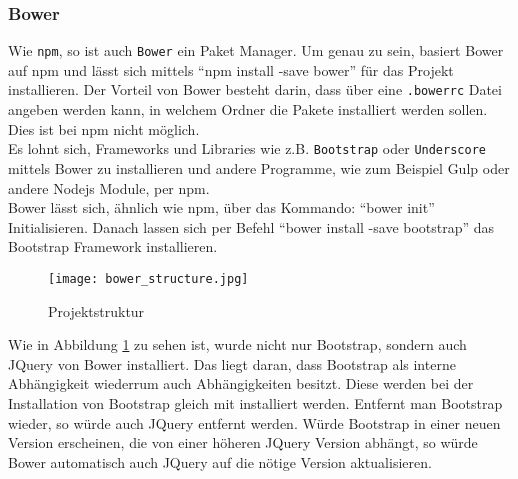 
		\subsubsection{Bower} %
		\label{ssub:bower}
			Wie \texttt{npm}, so ist auch \texttt{Bower} ein Paket Manager. Um genau zu sein, basiert Bower auf npm und lässt sich mittels "`npm install -save bower"' für das Projekt installieren. Der Vorteil von Bower besteht darin, dass über eine \texttt{.bowerrc} Datei angeben werden kann, in welchem Ordner die Pakete installiert werden sollen. Dies ist bei npm nicht möglich.\\
			Es lohnt sich, Frameworks und Libraries wie z.B. \texttt{Bootstrap} oder \texttt{Underscore} mittels Bower zu installieren und andere Programme, wie zum Beispiel Gulp oder andere Nodejs Module, per npm.\\
			Bower lässt sich, ähnlich wie npm, über das Kommando: "`bower init"' Initialisieren. Danach lassen sich per Befehl "`bower install -save bootstrap"' das Bootstrap Framework installieren. 

			\begin{figure}[htbp]
				\begin{center}
					\texttt{[image: bower\_structure.jpg]}
					\caption{Projektstruktur}
					\label{fig:bower_structure}
				\end{center}
			\end{figure}
			
			Wie in Abbildung \ref{fig:bower_structure} zu sehen ist, wurde nicht nur Bootstrap, sondern auch JQuery von Bower installiert. Das liegt daran, dass Bootstrap als interne Abhängigkeit wiederrum auch Abhängigkeiten besitzt. Diese werden bei der Installation von Bootstrap gleich mit installiert werden. Entfernt man Bootstrap wieder, so würde auch JQuery entfernt werden. Würde Bootstrap in einer neuen Version erscheinen, die von einer höheren JQuery Version abhängt, so würde Bower automatisch auch JQuery auf die nötige Version aktualisieren.
		



